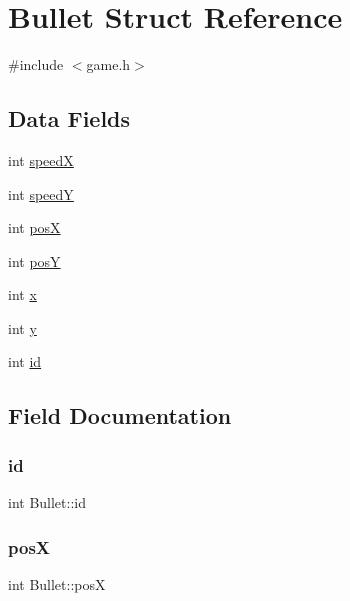 \hypertarget{struct_bullet}{}\section{Bullet Struct Reference}
\label{struct_bullet}


{\ttfamily \#include $<$game.\+h$>$}

\subsection*{Data Fields}
\begin{DoxyCompactItemize}
\item 
int \mbox{\hyperlink{struct_bullet_a82599c14ed9a73741bc856d476176da3}{speedX}}
\item 
int \mbox{\hyperlink{struct_bullet_a26093711aaa5ded2d5665ee5132672d8}{speedY}}
\item 
int \mbox{\hyperlink{struct_bullet_aaff8e7a3adc6d7a6e774637bd33cd119}{posX}}
\item 
int \mbox{\hyperlink{struct_bullet_a644e6895da8de9104266f5258aeed8f6}{posY}}
\item 
int \mbox{\hyperlink{struct_bullet_add8da3ee8a3265a38ebbfe8a254ebb19}{x}}
\item 
int \mbox{\hyperlink{struct_bullet_a524e0ee515b1418341cdd8f8dffce1ee}{y}}
\item 
int \mbox{\hyperlink{struct_bullet_a0a9eaf4c15d27ab4354a242503ddd0af}{id}}
\end{DoxyCompactItemize}


\subsection{Field Documentation}
\mbox{\label{struct_bullet_a0a9eaf4c15d27ab4354a242503ddd0af}} 
\subsubsection{\texorpdfstring{id}{id}}
{\footnotesize\ttfamily int Bullet\+::id}

\mbox{\label{struct_bullet_aaff8e7a3adc6d7a6e774637bd33cd119}} 
\subsubsection{\texorpdfstring{posX}{posX}}
{\footnotesize\ttfamily int Bullet\+::posX}

